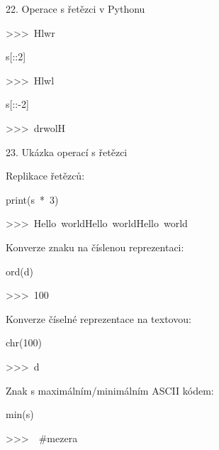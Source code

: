 \documentclass[czech]{beamer}
\newenvironment{lyxcode}
  {\par\begin{list}{}{
    \setlength{\rightmargin}{\leftmargin}
    \setlength{\listparindent}{0pt}%
    \raggedright
    \setlength{\itemsep}{0pt}
    \setlength{\parsep}{0pt}
    \normalfont\ttfamily}%
   \def\{{\char`\{}
   \def\}{\char`\}}
   \def\textasciitilde{\char`\~}
   \item[]}
  {\end{list}}
\begin{document}
\begin{frame}{22. Operace s řetězci v Pythonu}
\begin{lyxcode}
{\scriptsize >\textcompwordmark >\textcompwordmark >~Hlwr}{\scriptsize\par}

{\scriptsize s{[}::2{]}}{\scriptsize\par}

{\scriptsize >\textcompwordmark >\textcompwordmark >~Hlwl}{\scriptsize\par}

{\scriptsize s{[}::-2{]}}{\scriptsize\par}

{\scriptsize >\textcompwordmark >\textcompwordmark >~drwolH}{\scriptsize\par}
\end{lyxcode}
\end{frame}

\begin{frame}[plain]{23. Ukázka operací s řetězci}

{\tiny Replikace řetězců:}{\tiny\par}
\begin{lyxcode}
{\tiny print(s~{*}~3)}{\tiny\par}

{\tiny >\textcompwordmark >\textcompwordmark >~Hello~worldHello~worldHello~world}{\tiny\par}
\end{lyxcode}
{\tiny Konverze znaku na číslenou reprezentaci:}{\tiny\par}
\begin{lyxcode}
{\tiny ord(d)}{\tiny\par}

{\tiny >\textcompwordmark >\textcompwordmark >~100}{\tiny\par}
\end{lyxcode}
{\tiny Konverze číselné reprezentace na textovou:}{\tiny\par}
\begin{lyxcode}
{\tiny chr(100)}{\tiny\par}

{\tiny >\textcompwordmark >\textcompwordmark >~d}{\tiny\par}
\end{lyxcode}
{\tiny Znak s maximálním/minimálním ASCII kódem:}{\tiny\par}
\begin{lyxcode}
{\tiny min(s)}{\tiny\par}

{\tiny >\textcompwordmark >\textcompwordmark >~~\#mezera}{\tiny\par}


\end{lyxcode}
\end{frame}
\end{document}
